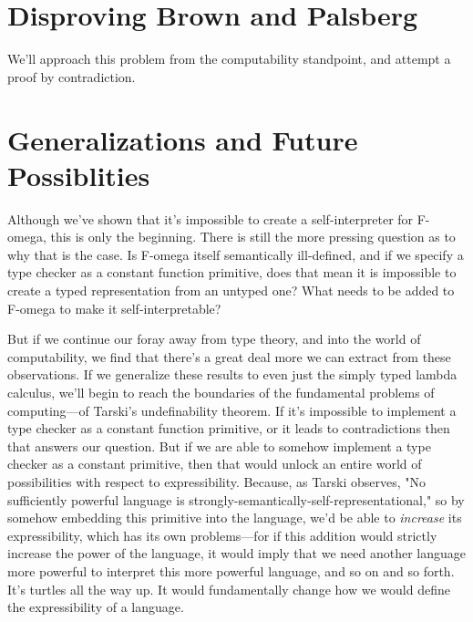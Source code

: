 \documentclass{article}
\begin{document}
\section{Disproving Brown and Palsberg}
We'll approach this problem from the computability standpoint, and attempt a proof by contradiction.


\section{Generalizations and Future Possiblities}
Although we've shown that it's impossible to create a self-interpreter for F-omega, this is only the beginning. There is still the more pressing question as to why that is the case. Is F-omega itself semantically ill-defined, and if we specify a type checker as a constant function primitive, does that mean it is impossible to create a typed representation from an untyped one? What needs to be added to F-omega to make it self-interpretable?

But if we continue our foray away from type theory, and into the world of computability, we find that there's a great deal more we can extract from these observations. If we generalize these results to even just the simply typed lambda calculus, we'll begin to reach the boundaries of the fundamental problems of computing—of Tarski's undefinability theorem. If it's impossible to implement a type checker as a constant function primitive, or it leads to contradictions then that answers our question. But if we are able to somehow implement a type checker as a constant primitive, then that would unlock an entire world of possibilities with respect to expressibility. Because, as Tarski observes, "No sufficiently powerful language is strongly-semantically-self-representational," so by somehow embedding this primitive into the language, we'd be able to \textit{increase} its expressibility, which has its own problems—for if this addition would strictly increase the power of the language, it would imply that we need another language more powerful to interpret this more powerful language, and so on and so forth. It's turtles all the way up. It would fundamentally change how we would define the expressibility of a language.
\end{document}
